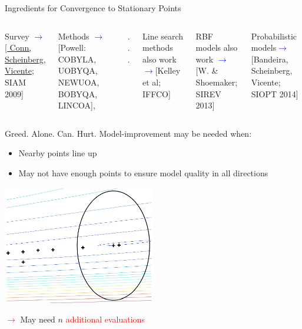 \documentclass[handout,aspectratio=54]{beamer}
\numberwithin{theorem}{section}
\begin{document}
\begin{frame}{Ingredients for Convergence to Stationary Points}
\begin{columns}
\tiny\flushright
Survey \textcolor{blue}{$\rightarrow$}\textcolor[RGB]{128,0,128}{[\underline{ Conn, Scheinberg, Vicente}; SIAM 2009]}

Methods \textcolor{blue}{$\rightarrow$}\textcolor[RGB]{128,0,128}{[Powell: COBYLA, UOBYQA, NEWUOA, BOBYQA, LINCOA],}

. . .

Line search methods also work \textcolor{blue}{$\rightarrow$}\textcolor[RGB]{128,0,128}{[Kelley et al; IFFCO]}

RBF models also work \textcolor{blue}{$\rightarrow$}\textcolor[RGB]{128,0,128}{[W. \& Shoemaker; SIREV 2013]}

Probabilistic models\textcolor{blue}{$\rightarrow$}\textcolor[RGB]{128,0,128}{[Bandeira, Scheinberg, Vicente; SIOPT 2014]}
\end{columns}
\end{frame}

\begin{frame}{Greed. Alone. Can. Hurt.}
Model-improvement may be needed when:
\begin{itemize}
\item Nearby points line up
\item May not have enough points to ensure model quality in all directions
\end{itemize}

\begin{center}
\includegraphics[width=0.5\textwidth]{fig/31.jpg}
\end{center}

\textcolor{red}{$\rightarrow$} May need $n$ \textcolor{red}{additional evaluations}
\end{frame}
\end{document}
